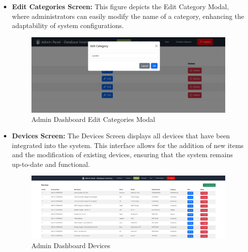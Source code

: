 \begin{itemize}
\item \textbf {Edit Categories Screen: }This figure depicts the Edit Category Modal, where administrators can easily modify the name of a category, enhancing the adaptability of system configurations.
\begin{figure}[h]
    \centering
    \includegraphics[width=1\linewidth]{images/edit categorie.JPG}
    \caption{Admin Dashboard Edit Categories Modal}
    \label{fig:edit-category-modal}
\end{figure}


\item \textbf {Devices Screen: }The Devices Screen displays all devices that have been integrated into the system. This interface allows for the addition of new items and the modification of existing devices, ensuring that the system remains up-to-date and functional.
\begin{figure}[h]
    \centering
    \includegraphics[width=1\linewidth]{images/devices.JPG}
    \caption{Admin Dashboard Devices}
    \label{fig:devices-dashboard}
\end{figure}


\end{itemize}
